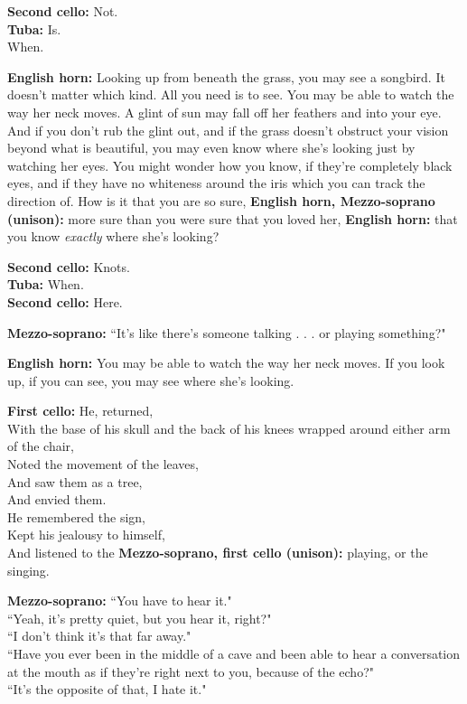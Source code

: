 \documentclass[11pt]{article}
\begin{document}
\begingroup
\textbf{Second cello:} Not. \\ \textbf{Tuba:} Is. \\ When.
\endgroup

\begingroup
\textbf{English horn:} Looking up from beneath the grass, you may see a songbird. It doesn't matter which kind. All you need is to see. You may be able to watch the way her neck moves. A glint of sun may fall off her feathers and into your eye. And if you don't rub the glint out, and if the grass doesn't obstruct your vision beyond what is beautiful, you may even know where she's looking just by watching her eyes. You might wonder how you know, if they're completely black eyes, and if they have no whiteness around the iris which you can track the direction of. How is it that you are so sure, \textbf{English horn, Mezzo-soprano (unison):} more sure than you were sure that you loved her, \textbf{English horn:} that you know \textit{exactly} where she's looking?
\endgroup

\begingroup
\textbf{Second cello:} Knots. \\ \textbf{Tuba:} When. \\ \textbf{Second cello:} Here.
\endgroup

\begingroup
\textbf{Mezzo-soprano:} ``It's like there's someone talking . . . or playing something?"
\endgroup

\begingroup
\textbf{English horn:} You may be able to watch the way her neck moves. If you look up, if you can see, you may see where she's looking.
\endgroup

\begingroup
\textbf{First cello:} He, returned, \\ With the base of his skull and the back of his knees wrapped around either arm of the chair, \\ Noted the movement of the leaves, \\ And saw them as a tree, \\ And envied them. \\ He remembered the sign, \\ Kept his jealousy to himself, \\ And listened to the \textbf{Mezzo-soprano, first cello (unison):} playing, or the singing.
\endgroup

\begingroup
\textbf{Mezzo-soprano:} ``You have to hear it." \\ ``Yeah, it's pretty quiet, but you hear it, right?" \\ ``I don't think it's that far away." \\ ``Have you ever been in the middle of a cave and been able to hear a conversation at the mouth as if they're right next to you, because of the echo?" \\ ``It's the opposite of that, I hate it."
\endgroup
\end{document}
